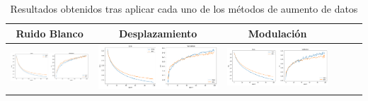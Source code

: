 \documentclass[11pt,a4paper,spanish]{book}
\begin{document}
		\begin{table}[H]
			\centering
			\begin{center}
				\begin{tabular}{| c | c | c | c | c | c |}
					\hline
					Ruido Blanco & Desplazamiento & Modulación \\ 
					\hline
					\includegraphics[scale=0.15]{results/white_noise2.png} & \includegraphics[scale=0.15]{results/shiftting_2.png} & \includegraphics[scale=0.15]{results/pitch_2.png}\\
					
					\hline	
				\end{tabular}
				\caption{Resultados obtenidos tras aplicar cada uno de los métodos de aumento de datos}
				\label{tab:augmentationData_2}
			\end{center}
		\end{table}
	
	\printbibliography
	
\end{document}
